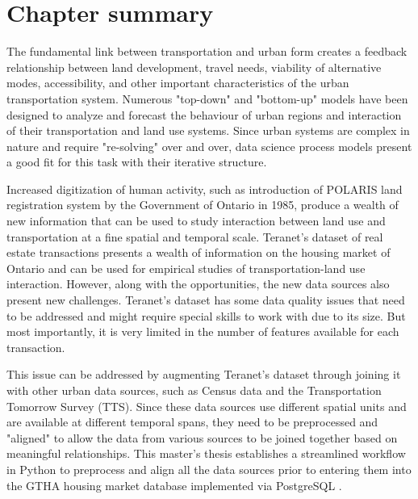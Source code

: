 \section{Chapter summary} \label{sec:background_summary}

The fundamental link between transportation and urban form creates a feedback relationship between land development, travel needs, viability of alternative modes, accessibility, and other important characteristics of the urban transportation system.
Numerous "top-down" and "bottom-up" models have been designed to analyze and forecast the behaviour of urban regions and interaction of their transportation and land use systems.
Since urban systems are complex in nature and require "re-solving" over and over, data science process models present a good fit for this task with their iterative structure.

Increased digitization of human activity, such as introduction of POLARIS land registration system by the Government of Ontario in 1985, produce a wealth of new information that can be used to study interaction between land use and transportation at a fine spatial and temporal scale.
Teranet's dataset of real estate transactions presents a wealth of information on the housing market of Ontario and can be used for empirical studies of transportation-land use interaction.
However, along with the opportunities, the new data sources also present new challenges.
Teranet's dataset has some data quality issues that need to be addressed and might require special skills to work with due to its size.
But most importantly, it is very limited in the number of features available for each transaction.

This issue can be addressed by augmenting Teranet's dataset through joining it with other urban data sources, such as Census data and the Transportation Tomorrow Survey (TTS).
Since these data sources use different spatial units and are available at different temporal spans, they need to be preprocessed and "aligned" to allow the data from various sources to be joined together based on meaningful relationships.
This master's thesis establishes a streamlined workflow in Python to preprocess and align all the data sources prior to entering them into the GTHA housing market database implemented via PostgreSQL .
